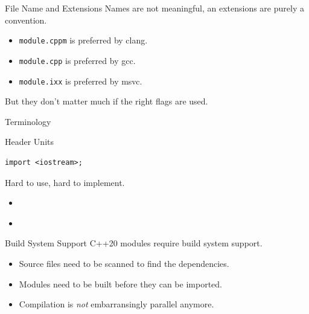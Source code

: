 \documentclass[]{beamer}
\begin{document}
\begin{frame}{File Name and Extensions}
  Names are not meaningful, an extensions are purely a convention.

  \begin{itemize}
    \item \texttt{module.cppm} is preferred by clang.
    \item \texttt{module.cpp} is preferred by gcc.
    \item \texttt{module.ixx} is preferred by msvc.
  \end{itemize}

  But they don't matter much if the right flags are used.
\end{frame}

\begin{frame}[containsverbatim]{Terminology}
  \begin{block}{Header Units}
    \begin{verbatim}
import <iostream>;
    \end{verbatim}
    \vspace{1em}
    Hard to use, hard to implement.
    \begin{itemize}
      \item \cite{Engert23}
      \item \cite{Ruoso23}
    \end{itemize}
  \end{block}
\end{frame}

\begin{frame}{Build System Support}
  C++20 modules require build system support.
  \begin{itemize}
    \item Source files need to be scanned to find the dependencies.
    \item Modules need to be built before they can be imported.
    \item Compilation is \emph{not} embarransingly parallel anymore.
  \end{itemize}
\end{frame}
\end{document}
